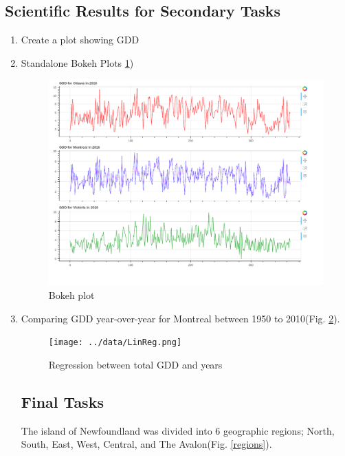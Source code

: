 \documentclass{article}
\begin{document}
\subsection{ \bf Scientific Results for Secondary Tasks
 }
\begin{enumerate}
\item Create a plot showing GDD

\item Standalone Bokeh Plots \ref{bokeh})

\begin{center}
\begin{figure}[H]
\centering
\includegraphics[width=4.5in]{../docs/BokehPlot.png}


\caption{Bokeh plot }
\label{bokeh}
\end{figure}
\end{center}

\item Comparing GDD year-over-year for Montreal between 1950 to 2010(Fig. \ref{regression}).

\begin{center}
\begin{figure}[H]
\centering
\texttt{[image: ../data/LinReg.png]}


\caption{Regression between total GDD and years}
\label{regression}
\end{figure}
\end{center}



\subsection {\bf Final Tasks} 
The island of Newfoundland was divided into 6 geographic regions; North, South, East, West, Central, and The Avalon(Fig. \ref{regions}).


\end{enumerate}
\end{document}
